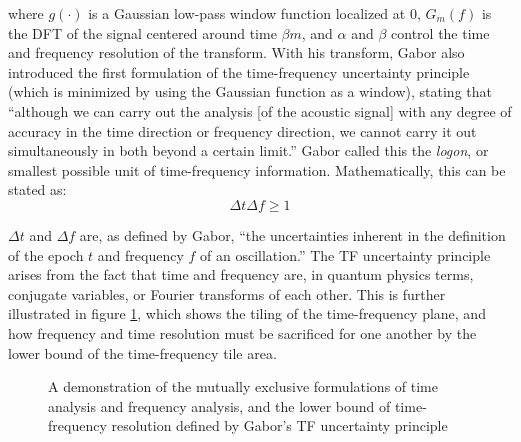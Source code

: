 \documentclass[letter,12pt]{article}
\begin{document}
where $g(\cdot)$ is a Gaussian low-pass window function localized at 0, $G_{m}(f)$ is the DFT of the signal centered around time $\beta m$, and $\alpha$ and $\beta$ control the time and frequency resolution of the transform. With his transform, Gabor also introduced the first formulation of the time-frequency uncertainty principle (which is minimized by using the Gaussian function as a window), stating that ``although we can carry out the analysis [of the acoustic signal] with any degree of accuracy in the time direction or frequency direction, we cannot carry it out simultaneously in both beyond a certain limit.'' Gabor called this the \textit{logon}, or smallest possible unit of time-frequency information. Mathematically, this can be stated as:
\[ \Delta t\Delta f \ge 1 \]

$\Delta t$ and $\Delta f$ are, as defined by Gabor, ``the uncertainties inherent in the definition of the epoch $t$ and frequency $f$ of an oscillation.'' The TF uncertainty principle arises from the fact that time and frequency are, in quantum physics terms, conjugate variables, or Fourier transforms of each other. This is further illustrated in figure \ref{fig:gabortf}, which shows the tiling of the time-frequency plane, and how frequency and time resolution must be sacrificed for one another by the lower bound of the time-frequency tile area.

\begin{figure}[ht]
	\centering
	\hspace{0.1em}
	\caption{A demonstration of the mutually exclusive formulations of time analysis and frequency analysis, and the lower bound of time-frequency resolution defined by Gabor's TF uncertainty principle \cite{gabordiagrams}}
	\label{fig:gabortf}
\end{figure}
\end{document}
